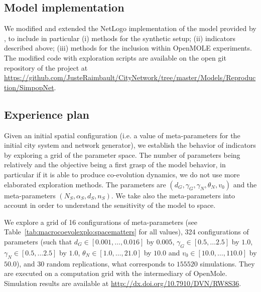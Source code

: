 \documentclass[graybox]{svmult}
\begin{document}
\subsection{Model implementation}

We modified and extended the NetLogo implementation of the model provided by \cite{schmitt2014modelisation}, to include in particular (i) methods for the synthetic setup; (ii) indicators described above; (iii) methods for the inclusion within OpenMOLE experiments. The modified code with exploration scripts are available on the open git repository of the project at \url{https://github.com/JusteRaimbault/CityNetwork/tree/master/Models/Reproduction/SimpopNet}.



\subsection{Experience plan}

Given an initial spatial configuration (i.e. a value of meta-parameters for the initial city system and network generator), we establish the behavior of indicators by exploring a grid of the parameter space. The number of parameters being relatively and the objective being a first grasp of the model behavior, in particular if it is able to produce co-evolution dynamics, we do not use more elaborated exploration methods. The parameters are $(d_G,\gamma_G,\gamma_N,\theta_N,v_0)$ and the meta-parameters $(N_S,\alpha_S,d_S,n_S)$. We take also the meta-parameters into account in order to understand the sensitivity of the model to space.

We explore a grid of 16 configurations of meta-parameters (see Table~\ref{tab:macrocoevolexplo:spacematters} for all values), 324 configurations of parameters (such that $d_G \in \left[0.001, \ldots , 0.016\right]$ by $0.005$, $\gamma_G \in \left[0.5 , \ldots 2.5\right]$ by $1.0$, $\gamma_N \in \left[0.5 , \ldots 2.5\right]$ by $1.0$, $\theta_N \in \left[1.0 , \ldots , 21.0\right]$ by $10.0$ and $v_0 \in \left[10.0, \ldots , 110.0\right]$ by $50.0$), and 30 random replications, what corresponds to $155520$ simulations. They are executed on a computation grid with the intermediary of OpenMole. Simulation results are available at \url{http://dx.doi.org/10.7910/DVN/RW8S36}.


\end{document}
